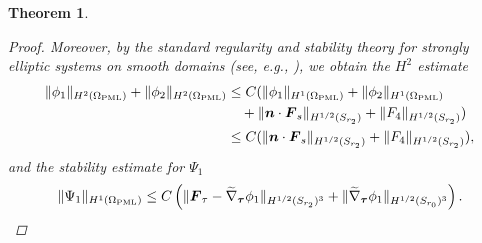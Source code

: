 \documentclass[11pt]{article}
\newcommand{\no}{\nonumber}
\newcommand{\Om}{\Omega}
\newcommand{\wid}{\widetilde}
\newcommand{\bs}{\boldsymbol}
\newcommand{\PML}{{\rm PML}}
\newtheorem{theorem}{Theorem}[section]
\begin{document}
\begin{theorem}
\begin{proof}
Moreover, by the standard regularity and stability theory for strongly elliptic systems on smooth domains 
(see, e.g., \cite[Theorems 4.16 and 4.18]{McLean2000}), we obtain the $H^2$ estimate 
\begin{align}\no
\Vert \phi_1\Vert_{H^2(\Om_\PML)}+\Vert\phi_2\Vert_{H^2(\Om_\PML)}&\leq C(\Vert \phi_1\Vert_{H^1(\Om_\PML)}
+\Vert\phi_2\Vert_{H^1(\Om_\PML)}\\\label{layerbiharmonicellipiticestimates}
&\quad+\Vert \bs{n}\cdot\bs{F}_s\Vert_{H^{1/2}(S_{r_2})}+\Vert F_4\Vert_{H^{1/2}(S_{r_2} )})\\ \no
&\leq C(\Vert \bs{n}\cdot\bs{F}_s\Vert_{H^{1/2}(S_{r_2})}+\Vert F_4\Vert_{H^{1/2}(S_{r_2} )}),
\end{align}
and the stability estimate for $\Psi_1$
\begin{equation}\label{layermaxwellellipticstab}
\|\Psi_1\|_{H^1(\Om_\PML)} \leq C\left(\|\bs{F}_{\tau}-\wid{\nabla}_{\bs{\tau}}\phi_1\|_{H^{1/2}(S_{r_2})^3}
+\|\wid{\nabla}_{\bs{\tau}}\phi_1\|_{H^{1/2}(S_{r_0})^3}\right).
\end{equation}


\end{proof}
\end{theorem}
\end{document}
